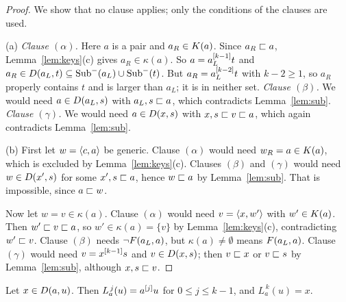 \begin{proof}
We show that no clause applies; only the conditions of the clauses are used.

(a) \emph{Clause $(\alpha)$.} Here $a$ is a pair and $a_R\in K(a)$. Since
$a_R\sqsubset a$, Lemma~\ref{lem:keys}(c) gives $a_R\in\kappa(a)$. So
$a=a_L^{[k-1]}t$ and $a_R\in D(a_L,t)\subseteq\operatorname{Sub}^{-}(a_L)\cup\operatorname{Sub}^{-}(t)$. But
$a_R=a_L^{[k-2]}t$ with $k-2\ge1$, so $a_R$ properly contains $t$ and is
larger than $a_L$; it is in neither set.
\emph{Clause $(\beta)$.} We would need $a\in D(a_L,s)$ with $a_L,s\sqsubset a$,
which contradicts Lemma~\ref{lem:sub}.
\emph{Clause $(\gamma)$.} We would need $a\in D(x,s)$ with $x,s\sqsubset v\sqsubset a$,
which again contradicts Lemma~\ref{lem:sub}.

(b) First let $w=\langle c,a\rangle$ be generic. Clause $(\alpha)$ would need
$w_R=a\in K(a)$, which is excluded by Lemma~\ref{lem:keys}(c). Clauses
$(\beta)$ and $(\gamma)$ would need $w\in D(x',s)$ for some $x',s\sqsubset a$,
hence $w\sqsubset a$ by Lemma~\ref{lem:sub}. That is impossible, since $a\sqsubset w$.

Now let $w=v\in\kappa(a)$. Clause $(\alpha)$ would need $v=\langle x,w'\rangle$ with
$w'\in K(a)$. Then $w'\sqsubset v\sqsubset a$, so $w'\in\kappa(a)=\{v\}$ by
Lemma~\ref{lem:keys}(c), contradicting $w'\sqsubset v$. Clause $(\beta)$ needs
$\neg F(a_L,a)$, but $\kappa(a)\neq\emptyset$ means $F(a_L,a)$. Clause
$(\gamma)$ would need $v=x^{[k-1]}s$ and $v\in D(x,s)$; then $v\sqsubset x$ or
$v\sqsubset s$ by Lemma~\ref{lem:sub}, although $x,s\sqsubset v$.
\end{proof}

\begin{lemma}\label{lem:decoding}
Let $x\in D(a,u)$. Then $L_a^{\,j}(u)=a^{[j]}u$ for $0\le j\le k-1$, and
$L_a^{\,k}(u)=x$.
\end{lemma}

